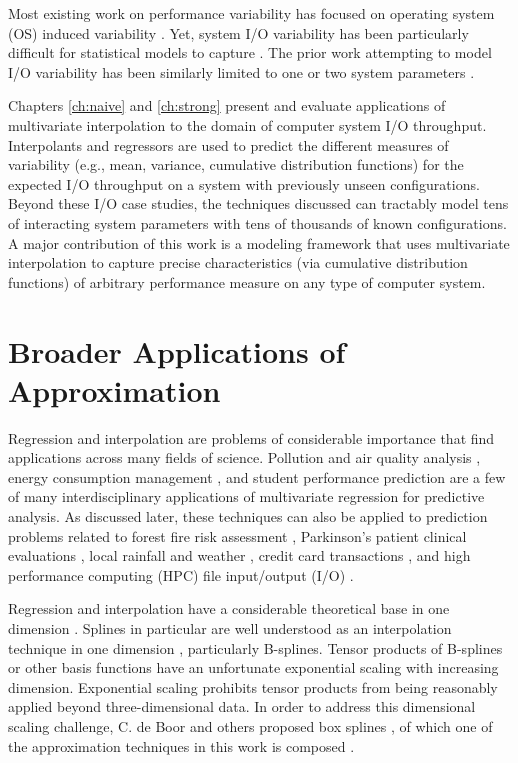 Most existing work on performance variability has focused on operating system (OS) induced variability \cite{beckman2008benchmarking,de2007identifying}. Yet, system I/O variability has been particularly difficult for statistical models to capture \cite{bailey2005performance}. The prior work attempting to model I/O variability has been similarly limited to one or two system parameters \cite{lofstead2010managing}.

Chapters \ref{ch:naive} and \ref{ch:strong} present and evaluate applications of multivariate interpolation to the domain of computer system I/O throughput. Interpolants and regressors are used to predict the different measures of variability (e.g., mean, variance, cumulative distribution functions) for the expected I/O throughput on a system with previously unseen configurations. Beyond these I/O case studies, the techniques discussed can tractably model tens of interacting system parameters with tens of thousands of known configurations. A major contribution of this work is a modeling framework that uses multivariate interpolation to capture precise characteristics (via cumulative distribution functions) of arbitrary performance measure on any type of computer system.


\section{Broader Applications of Approximation}

Regression and interpolation are problems of considerable importance
that find applications across many fields of science. Pollution and
air quality analysis \cite{de2008field}, energy consumption management
\cite{lazos2014optimisation}, and student performance prediction
\cite{cortez2008using,lux2016applications} are a few of many
interdisciplinary applications of multivariate regression for
predictive analysis. As discussed later, these techniques can also be
applied to prediction problems related to forest fire risk assessment
\cite{cortez2007data}, Parkinson's patient clinical evaluations
\cite{tsanas2010accurate}, local rainfall and weather
\cite{williams2009rattle}, credit card transactions
\cite{pozzolo2015calibrating}, and high performance computing (HPC)
file input/output (I/O) \cite{lux2018nonparametric}.

Regression and interpolation have a considerable theoretical base in
one dimension \cite{cheney2009course}. Splines in particular are well
understood as an interpolation technique in one dimension
\cite{de1978practical}, particularly B-splines. Tensor products of
B-splines \cite{unther1996interpolating} or other basis functions have
an unfortunate exponential scaling with increasing
dimension. Exponential scaling prohibits tensor products from being
reasonably applied beyond three-dimensional data. In order to address
this dimensional scaling challenge, C. de Boor and others proposed box
splines \cite{de2013box}, of which one of the approximation techniques
in this work is composed \cite{lux2018novel}.

